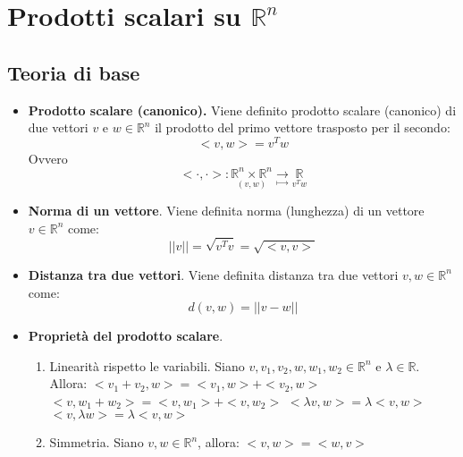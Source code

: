 \documentclass[12pt,a4paper,oneside]{book}
\begin{document}
\newpage
		\chapter{Prodotti scalari su $\mathbb{R}^n$}


			   	 \section{Teoria di base}
			   	 
\begin{itemize}

\item \textbf{Prodotto scalare (canonico).} \linebreak
	  Viene definito prodotto scalare (canonico) di due vettori $v$ e $w \in\mathbb{R}^n$ il prodotto del
	  primo vettore trasposto per il secondo:
	  $$<v, w> = v^Tw$$
	  Ovvero $$<\cdot, \cdot>:\underset{(v, w)}{\mathbb{R}^n\times \mathbb{R}^n} \underset{\mapsto}
	  {\rightarrow} \underset{v^Tw}{\mathbb{R}}$$
	
\item \textbf{Norma di un vettore}. \linebreak
	  Viene definita norma (lunghezza) di un vettore $v\in\mathbb{R}^n$ come:
	  $$||v|| = \sqrt{v^Tv}=\sqrt{<v, v>}$$
	
\item \textbf{Distanza tra due vettori}. \linebreak
	  Viene definita distanza tra due vettori $v, w\in\mathbb{R}^n$ come: $$d(v, w) = ||v-w||$$
	
\item \textbf{Proprietà del prodotto scalare}. \linebreak
	  \begin{enumerate}
	  \item Linearità rispetto le variabili. \linebreak
		    Siano $v, v_1, v_2, w, w_1, w_2\in\mathbb{R}^n$ e $\lambda\in \mathbb{R}$. Allora: \hfill 
		    \break
		    $<v_1+v_2, w> = <v_1, w> + <v_2, w>$ \hfill \break
		    $<v, w_1+w_2> = <v, w_1> + <v, w_2>$ \hfill \break
		    $<\lambda v, w> = \lambda <v, w>$ \hfill \break
		    $<v, \lambda w> = \lambda <v, w>$
	  \item Simmetria. \linebreak
		    Siano $v, w\in\mathbb{R}^n$, allora: \hfill \break
		    $<v, w> = <w, v>$
	  \end{enumerate}
	

\end{itemize}
\end{document}
